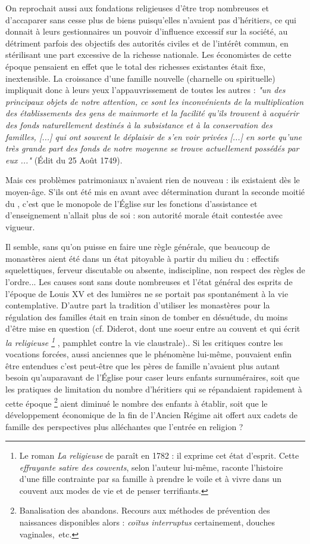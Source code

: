  On reprochait aussi aux fondations religieuses d'être trop nombreuses et d'accaparer sans cesse plus de biens puisqu'elles n'avaient pas d'héritiers, ce qui donnait à leurs gestionnaires un pouvoir d'influence excessif sur la société, au détriment parfois des objectifs des autorités civiles et de l'intérêt commun, en stérilisant une part excessive de la richesse nationale. Les économistes de cette époque pensaient en effet que le total des richesses existantes était fixe, inextensible. La croissance d'une famille nouvelle (charnelle ou spirituelle) impliquait donc à leurs yeux l'appauvrissement de toutes les autres : \emph{"un des principaux objets de notre attention, ce sont les inconvénients de la multiplication des établissements des gens de mainmorte et la facilité qu'ils trouvent à acquérir des fonds naturellement destinés à la subsistance et à la conservation des familles, \emph{[...]} qui ont souvent le déplaisir de s'en voir privées \emph{[...]} en sorte qu'une très grande part des fonds de notre moyenne se trouve actuellement possédés par eux ..."} (Édit du 25 Août 1749). 

 Mais ces problèmes patrimoniaux n'avaient rien de nouveau : ils existaient dès le moyen-âge. S'ils ont été mis en avant avec détermination durant la seconde moitié du , c'est que le monopole de l'Église sur les fonctions d'assistance et d'enseignement n'allait plus de soi : son autorité morale était contestée avec vigueur. 




 Il semble, sans qu'on puisse en faire une règle générale, que beaucoup de monastères aient été dans un état pitoyable à partir du milieu du  : effectifs squelettiques, ferveur discutable ou absente, indiscipline, non respect des règles de l'ordre... Les causes sont sans doute nombreuses et l'état général des esprits de l'époque de Louis XV et des lumières ne se portait pas spontanément à la vie contemplative. D'autre part la tradition d'utiliser les monastères pour la régulation des familles était en train sinon de tomber en désuétude, du moins d'être mise en question (cf. Diderot, dont une soeur entre au couvent et qui écrit \emph{la religieuse 
\footnote{Le roman \emph{La religieuse} de  paraît en 1782 : il exprime cet état d'esprit. Cette \emph{effrayante satire des couvents}, selon l'auteur lui-même, raconte l'histoire d'une fille contrainte par sa famille à prendre le voile et à vivre dans un couvent aux modes de vie et de penser terrifiants.} }, pamphlet contre la vie claustrale).. Si les critiques contre les vocations forcées, aussi anciennes que le phénomène lui-même, pouvaient enfin être entendues c'est peut-être que les pères de famille n'avaient plus autant besoin qu'auparavant de l'Église pour caser leurs enfants surnuméraires, soit que les pratiques de limitation du nombre d'héritiers qui se répandaient rapidement à cette époque%
\footnote{Banalisation des abandons. Recours aux méthodes de prévention des naissances disponibles alors : \emph{coïtus interruptus} certainement, douches vaginales,~etc.} 
aient diminué le nombre des enfants à établir, soit que le développement économique de la fin de l'Ancien Régime ait offert aux cadets de famille des perspectives plus alléchantes que l'entrée en religion ?

